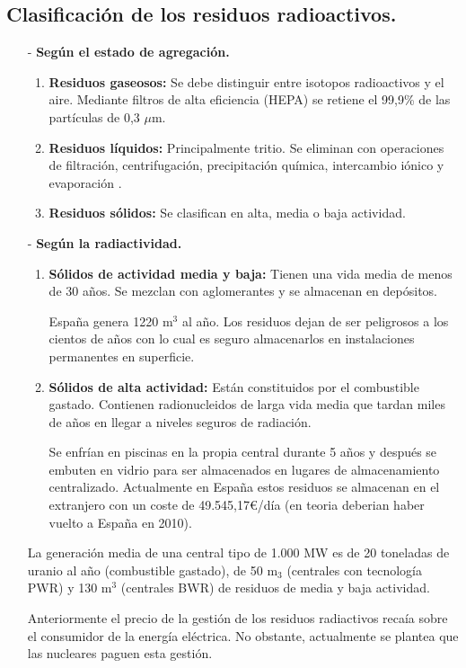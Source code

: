 \subsection{Clasificación de los residuos radioactivos.}
\begin{itemize}
	\item [-] \textbf{Según el estado de agregación.}
	\begin{enumerate}
		\item \textbf{Residuos gaseosos:} Se debe distinguir entre isotopos radioactivos y el aire. Mediante filtros de alta eficiencia (HEPA) se retiene el 99,9\% de las partículas de 0,3 $\mu$m.
		\item \textbf{Residuos líquidos:} Principalmente tritio. Se eliminan con operaciones de filtración, centrifugación, precipitación química,
		intercambio iónico y evaporación .
		\item \textbf{Residuos sólidos:} Se clasifican en alta, media o baja actividad.
	\end{enumerate}
	\item [-] \textbf{Según la radiactividad.}
	\begin{enumerate}
		\item \textbf{Sólidos de actividad media y baja:} Tienen una vida media de menos de 30 años. Se mezclan con aglomerantes y se almacenan en depósitos. 
		
		España genera 1220 m$^3$ al año. Los residuos dejan de ser peligrosos a los cientos de años con lo cual es seguro almacenarlos en instalaciones permanentes en superficie. 
		\item \textbf{Sólidos de alta actividad:} Están constituidos por el combustible gastado. Contienen radionucleidos de larga vida media que tardan miles de años en llegar a niveles seguros de radiación. 
		
		Se enfrían en piscinas en la propia central durante 5 años y después se embuten en vidrio para ser almacenados en lugares de almacenamiento centralizado. Actualmente en España estos residuos se almacenan en el extranjero con un coste de 49.545,17€/día (en teoria deberian haber vuelto a España en 2010).
	\end{enumerate}
	La generación media de una central tipo de 1.000 MW es de 20 toneladas de uranio al
	año (combustible gastado), de 50 m$_3$ (centrales con tecnología PWR) y 130 m$^3$
	(centrales BWR) de residuos de media y baja actividad.
	
	Anteriormente el precio de la gestión de los residuos radiactivos recaía sobre el consumidor de la energía eléctrica. No obstante, actualmente se plantea que las nucleares paguen esta gestión.
\end{itemize}
